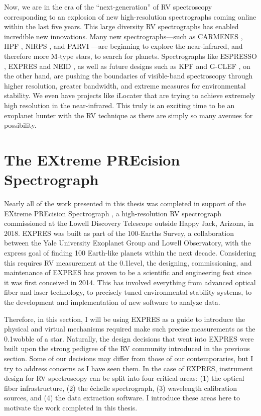 Now, we are in the era of the ``next-generation'' of RV spectroscopy corresponding to an explosion of new high-resolution spectrographs coming online within the last five years. This large diversity RV spectrographs has enabled incredible new innovations. Many new spectrographs---such as CARMENES \citep{quirrenbach_carmenes_2016}, HPF \citep{mahadevan_habitable-zone_2014}, NIRPS \citep{wildi_nirps_2017}, and PARVI \citep{gibson_characterization_2020}---are beginning to explore the near-infrared, and therefore more M-type stars, to search for planets. Spectrographs like ESPRESSO \citep{pepe_espresso_2013}, EXPRES \citep{jurgenson_expres_2016} and NEID \citep{schwab_design_2016}, as well as future designs such as KPF \citep{gibson_kpf_2016} and G-CLEF \citep{szentgyorgyi_gmt-consortium_2016}, on the other hand, are pushing the boundaries of visible-band spectroscopy through higher resolution, greater bandwidth, and extreme measures for environmental stability. We even have projects like iLocater \citep{crepp_ilocater_2016} that are trying to achieve extremely high resolution in the near-infrared. This truly is an exciting time to be an exoplanet hunter with the RV technique as there are simply so many avenues for possibility.

\section{The EXtreme PREcision Spectrograph} \label{intro:expres}

Nearly all of the work presented in this thesis was completed in support of the EXtreme PREcision Spectrograph \citep[EXPRES;][]{jurgenson_expres_2016, blackman_performance_2020, petersburg_extreme-precision_2020}, a high-resolution RV spectrograph commissioned at the Lowell Discovery Telescope outside Happy Jack, Arizona, in 2018. EXPRES was built as part of the 100-Earths Survey, a collaboration between the Yale University Exoplanet Group and Lowell Observatory, with the express goal of finding 100 Earth-like planets within the next decade. Considering this requires RV measurement at the 0.1\ms level, the designing, commissioning, and maintenance of EXPRES has proven to be a scientific and engineering feat since it was first conceived in 2014. This has involved everything from advanced optical fiber and laser technology, to precisely tuned environmental stability systems, to the development and implementation of new software to analyze data.

Therefore, in this section, I will be using EXPRES as a guide to introduce the physical and virtual mechanisms required make such precise measurements as the 0.1\ms wobble of a star. Naturally, the design decisions that went into EXPRES were built upon the strong pedigree of the RV community introduced in the previous section. Some of our decisions may differ from those of our contemporaries, but I try to address concerns as I have seen them. In the case of EXPRES, instrument design for RV spectroscopy can be split into four critical areas: (1) the optical fiber infrastructure, (2) the \'echelle spectrograph, (3) wavelength calibration sources, and (4) the data extraction software. I introduce these areas here to motivate the work completed in this thesis.


